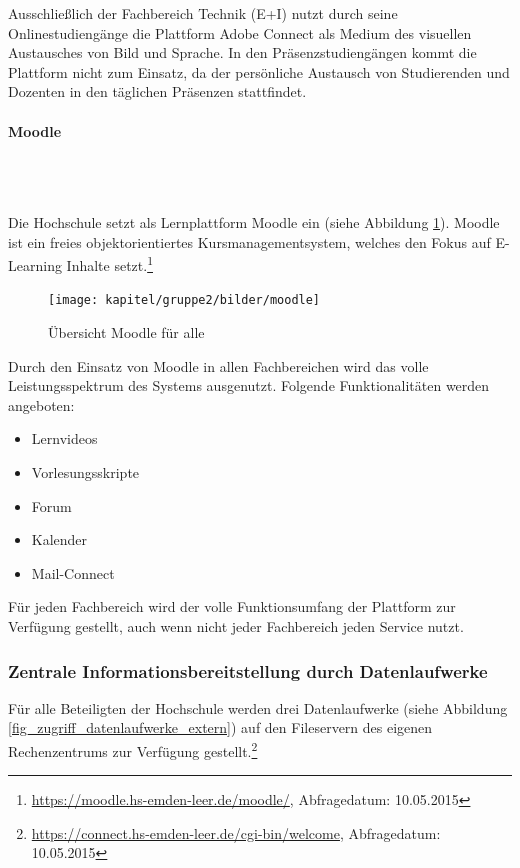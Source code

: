 Ausschließlich der Fachbereich Technik (E+I) nutzt durch seine Onlinestudiengänge die Plattform Adobe Connect als Medium des visuellen Austausches von Bild und Sprache. In den Präsenzstudiengängen kommt die Plattform nicht zum Einsatz, da der persönliche Austausch von Studierenden und Dozenten in den täglichen Präsenzen stattfindet.

\paragraph{Moodle}\mbox{}\\\\
\label{paragraph_moodle}

Die Hochschule setzt als Lernplattform Moodle ein (siehe Abbildung \ref{fig_moodle}). Moodle ist ein freies objektorientiertes Kursmanagementsystem, welches den Fokus auf E-Learning Inhalte setzt.\footnote{\url{https://moodle.hs-emden-leer.de/moodle/}, Abfragedatum: 10.05.2015}

\begin{figure}[h!]
	\centering
	\texttt{[image: kapitel/gruppe2/bilder/moodle]}
	\caption{Übersicht Moodle für alle \protect\footnotemark}
	\label{fig_moodle}
\end{figure}

Durch den Einsatz von Moodle in allen Fachbereichen wird das volle Leistungsspektrum des Systems ausgenutzt. Folgende Funktionalitäten werden angeboten:

\begin{itemize}
	\item Lernvideos
	\item Vorlesungsskripte
	\item Forum
	\item Kalender
	\item Mail-Connect
\end{itemize}

Für jeden Fachbereich wird der volle Funktionsumfang der Plattform zur Verfügung gestellt, auch wenn nicht jeder Fachbereich jeden Service nutzt. 

\subsubsection{Zentrale Informationsbereitstellung durch Datenlaufwerke}
\label{zentrale_Datenlaufwerke}
Für alle Beteiligten der Hochschule werden drei Datenlaufwerke (siehe Abbildung \ref{fig_zugriff_datenlaufwerke_extern}) auf den Fileservern des eigenen Rechenzentrums zur Verfügung gestellt.\footnote{\url{https://connect.hs-emden-leer.de/cgi-bin/welcome}, Abfragedatum: 10.05.2015}

